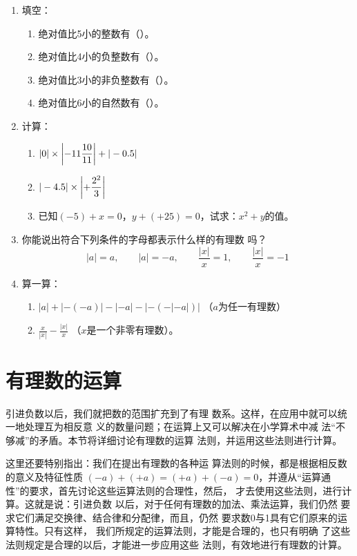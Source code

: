 \begin{enumerate}
	\item 填空：
	\begin{enumerate}
		\item 绝对值比5小的整数有（\qquad \qquad ）。
		\item 绝对值比4小的负整数有（\qquad \qquad ）。
		\item 绝对值比3小的非负整数有（\qquad \qquad ）。
		\item 绝对值比6小的自然数有（\qquad \qquad ）。
	\end{enumerate}
	
	
	\item 计算：
	\begin{enumerate}
		\item $|0|\times \left|-11\dfrac{10}{11}\right|+|-0.5|$
		\item $|-4.5|\times\left|+\dfrac{2^2}{3}\right|$
		\item 已知$(-5)+x=0$，$y+(+25)=0$，试求：$x^2+y$的值。
	\end{enumerate}
	
	\item 你能说出符合下列条件的字母都表示什么样的有理数
	吗？
	\[|a|=a,\qquad |a|=-a,\qquad \frac{|x|}{x}=1,\qquad \frac{|x|}{x}=-1  \]
	
	\item 算一算：
	\begin{enumerate}
		\item $|a|+|-(-a)|-|-a|-|-(-|-a|)|$ （$a$为任一有理数）
		\item $\frac{x}{|x|}-\frac{|x|}{x}$ （$x$是一个非零有理数）。
	\end{enumerate}
	
\end{enumerate}

\section{有理数的运算}
引进负数以后，我们就把数的范围扩充到了有理
数系。这样，在应用中就可以统一地处理互为相反意
义的数量问题；在运算上又可以解决在小学算术中减
法“不够减”的矛盾。本节将详细讨论有理数的运算
法则，并运用这些法则进行计算。

这里还要特别指出：我们在提出有理数的各种运
算法则的时候，都是根据相反数的意义及特征性质
$ (-a) + ( + a)=(+a)+(-a) = 0$，并遵从“运算通
性”的要求，首先讨论这些运算法则的合理性，然后，
才去使用这些法则，进行计算。这就是说：引进负数
以后，对于任何有理数的加法、乘法运算，我们仍然
要求它们满足交换律、结合律和分配律，而且，仍然
要求数0与1具有它们原来的运算特性。只有这样，
我们所规定的运算法则，才能是合理的，也只有明确
了这些法则规定是合理的以后，才能进一步应用这些
法则，有效地进行有理数的计算。

